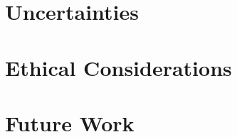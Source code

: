 \documentclass{senior-design}
\begin{document}
\section{Uncertainties}
\section{Ethical Considerations}
\section{Future Work}

\clearpage
\renewcommand*{\UrlFont}{\rmfamily}
\printbibliography[title={References},heading=bibintoc]
\clearpage
\end{document}
